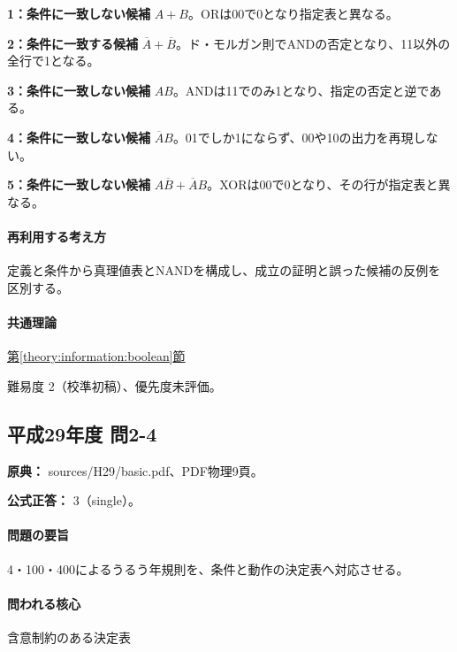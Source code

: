 \noindent\textbf{1：条件に一致しない候補} \(A+B\)。ORは00で0となり指定表と異なる。\par

\noindent\textbf{2：条件に一致する候補} \(\overline A+\overline B\)。ド・モルガン則でANDの否定となり、11以外の全行で1となる。\par

\noindent\textbf{3：条件に一致しない候補} \(AB\)。ANDは11でのみ1となり、指定の否定と逆である。\par

\noindent\textbf{4：条件に一致しない候補} \(\overline A B\)。01でしか1にならず、00や10の出力を再現しない。\par

\noindent\textbf{5：条件に一致しない候補} \(A\overline B+\overline A B\)。XORは00で0となり、その行が指定表と異なる。\par

\paragraph{再利用する考え方} 定義と条件から真理値表とNANDを構成し、成立の証明と誤った候補の反例を区別する。

\paragraph{共通理論} \hyperref[theory:information:boolean]{第\ref*{theory:information:boolean}節}

\par 難易度 2（校準初稿）、優先度未評価。

\subsection{平成29年度 問2-4}
\label{q:h29-reg-basic-2-4}

\noindent\textbf{原典：} sources/H29/basic.pdf、PDF物理9頁。

\textbf{公式正答：} 3（single）。

\paragraph{問題の要旨} 4・100・400によるうるう年規則を、条件と動作の決定表へ対応させる。

\paragraph{問われる核心} 含意制約のある決定表

